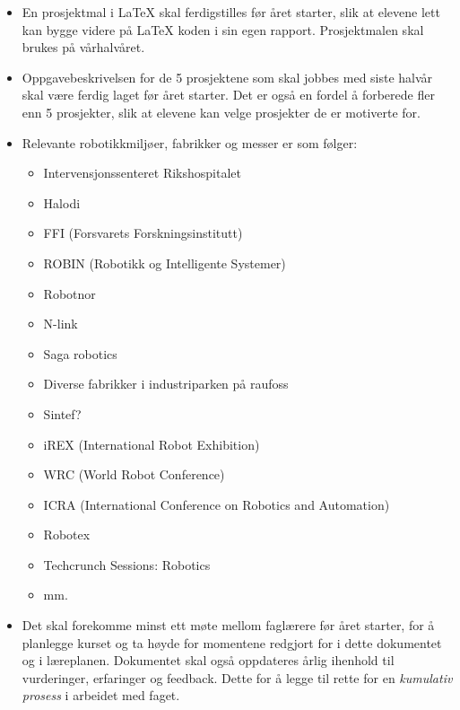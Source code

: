\begin{itemize}
        \item En prosjektmal i LaTeX skal ferdigstilles før året starter, slik at elevene lett kan bygge videre på LaTeX koden i sin egen rapport. Prosjektmalen skal brukes på vårhalvåret.

        \item Oppgavebeskrivelsen for de 5 prosjektene som skal jobbes med siste halvår skal være ferdig laget før året starter. Det er også en fordel å forberede fler enn 5 prosjekter, slik at elevene kan velge prosjekter de er motiverte for.

        \item Relevante robotikkmiljøer, fabrikker og messer er som følger:

            \begin{itemize}
                \item Intervensjonssenteret Rikshospitalet
                \item Halodi
                \item FFI (Forsvarets Forskningsinstitutt)
                \item ROBIN (Robotikk og Intelligente Systemer)
                \item Robotnor
                \item N-link
                \item Saga robotics
                \item Diverse fabrikker i industriparken på raufoss
                \item Sintef?
                \item iREX (International Robot Exhibition)
                \item WRC (World Robot Conference)
                \item ICRA (International Conference on Robotics and Automation)
                \item Robotex
                \item Techcrunch Sessions: Robotics
                \item mm.
            \end{itemize}

        \item Det skal forekomme minst ett møte mellom faglærere før året starter, for å planlegge kurset og ta høyde for momentene redgjort for i dette dokumentet og i læreplanen. Dokumentet skal også oppdateres årlig ihenhold til vurderinger, erfaringer og feedback. Dette for å legge til rette for en \emph{kumulativ prosess} i arbeidet med faget.

    \end{itemize}
